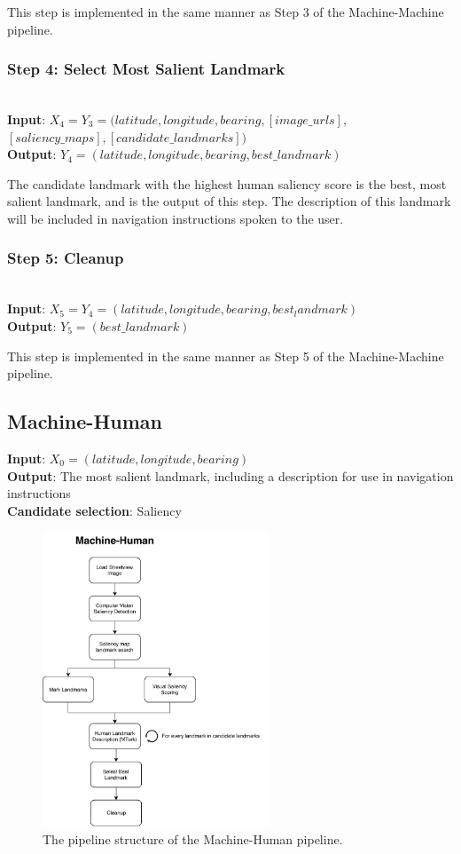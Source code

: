 This step is implemented in the same manner as Step 3 of the Machine-Machine pipeline.

\subsubsection*{Step 4: Select Most Salient Landmark}~\\
\noindent\textbf{Input}: $X_4 = Y_3 = (latitude, longitude, bearing,  [image\_urls], $\\$[saliency\_maps], [candidate\_landmarks] )$\\
\textbf{Output}: $Y_4 = (latitude, longitude, bearing, best\_landmark)$
 
The candidate landmark with the highest human saliency score is the best, most salient landmark, and is the output of this step. The description of this landmark will be included in navigation instructions spoken to the user.

\subsubsection*{Step 5: Cleanup}~\\
\noindent\textbf{Input}: $X_5 = Y_4 = (latitude, longitude, bearing, best_landmark)$\\
\textbf{Output}: $Y_5 = (best\_landmark)$

This step is implemented in the same manner as Step 5 of the Machine-Machine pipeline.

\subsection{Machine-Human}
\noindent\textbf{Input}: $X_0 = (latitude, longitude, bearing)$\\
\noindent\textbf{Output}: The most salient landmark, including a description for use in navigation instructions\\
\noindent\textbf{Candidate selection}: Saliency

\begin{figure}[htbp]
  \centering
  \includegraphics[width=0.6\textwidth]{pipeline_diagrams/machine-human.pdf}
  \caption{The pipeline structure of the Machine-Human pipeline.}
  \label{fig:pipeline:mh}
\end{figure}

